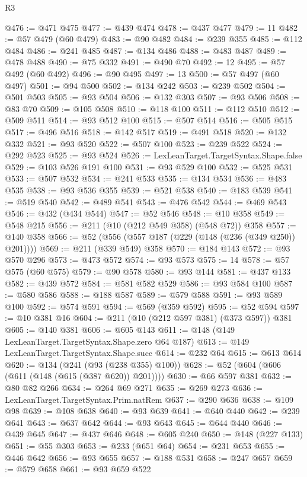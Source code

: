 \begin{lexlean}{R3}
\begin{coremodule}
@476 := @471 @475
@477 := @439 @474
@478 := @437 @477
@479 := 11
@482 := @57 @479 (@60 @479)
@483 := @90 @482
@484 := @239 @355
@485 := @112 @484
@486 := @241 @485
@487 := @134 @486
@488 := @483 @487
@489 := @478 @488
@490 := @75 @332
@491 := @490 @70
@492 := 12
@495 := @57 @492 (@60 @492)
@496 := @90 @495
@497 := 13
@500 := @57 @497 (@60 @497)
@501 := @94 @500
@502 := @134 @242
@503 := @239 @502
@504 := @501 @503
@505 := @93 @504
@506 := @132 @303
@507 := @93 @506
@508 := @83 @70
@509 := @105 @508
@510 := @118 @100
@511 := @112 @510
@512 := @509 @511
@514 := @93 @512 @100
@515 := @507 @514
@516 := @505 @515
@517 := @496 @516
@518 := @142 @517
@519 := @491 @518
@520 := @132 @332
@521 := @93 @520
@522 := @507 @100
@523 := @239 @522
@524 := @292 @523
@525 := @93 @524
@526 := LexLeanTarget.TargetSyntax.Shape.false
@529 := @103 @526 @191 @100
@531 := @93 @529 @100
@532 := @525 @531
@533 := @507 @532
@534 := @241 @533
@535 := @134 @534
@536 := @483 @535
@538 := @93 @536 @355
@539 := @521 @538
@540 := @183 @539
@541 := @519 @540
@542 := @489 @541
@543 := @476 @542
@544 := @469 @543
@546 := @432 (@434 @544)
@547 := @52 @546
@548 := @10 @358
@549 := @548 @215
@556 := @211 (@10 (@212 @549 @358) (@548 @72)) @358
@557 := @140 @358
@566 := @52 (@556 (@557 @187 (@229 (@148 (@236 (@349 @250)) @201))))
@569 := @211 (@339 @549) @358
@570 := @184 @143
@572 := @93 @570 @296
@573 := @473 @572
@574 := @93 @573
@575 := 14
@578 := @57 @575 (@60 @575)
@579 := @90 @578
@580 := @93 @144
@581 := @437 @133
@582 := @439 @572
@584 := @581 @582 @529
@586 := @93 @584 @100
@587 := @580 @586
@588 := @188 @587
@589 := @579 @588
@591 := @93 @589 @100
@592 := @574 @591
@594 := @569 (@359 @592)
@595 := @52 @594
@597 := @10 @381 @16
@604 := @211 (@10 (@212 @597 @381) (@373 @597)) @381
@605 := @140 @381
@606 := @605 @143
@611 := @148 (@149 LexLeanTarget.TargetSyntax.Shape.zero @64 @187)
@613 := @149 LexLeanTarget.TargetSyntax.Shape.succ
@614 := @232 @64
@615 := @613 @614
@620 := @134 (@241 (@93 (@238 @355) @100))
@628 := @52 (@604 (@606 (@611 (@148 (@615 (@387 @620)) @201))))
@630 := @66 @597 @381
@632 := @80 @82 @266
@634 := @264 @69 @271
@635 := @269 @273
@636 := LexLeanTarget.TargetSyntax.Prim.natRem
@637 := @290 @636
@638 := @109 @98
@639 := @108 @638
@640 := @93 @639
@641 := @640 @440
@642 := @239 @641
@643 := @637 @642
@644 := @93 @643
@645 := @644 @440
@646 := @439 @645
@647 := @437 @646
@648 := @605 @240
@650 := @148 (@227 @133)
@651 := @55 @303
@653 := @233 (@651 @64)
@654 := @231 @653
@655 := @446 @642
@656 := @93 @655
@657 := @188 @531
@658 := @247 @657
@659 := @579 @658
@661 := @93 @659 @522

\end{coremodule}
\end{lexlean}

